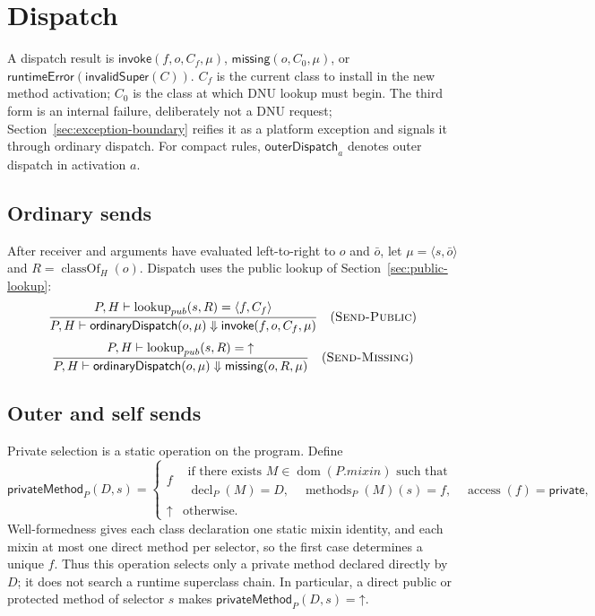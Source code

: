 \documentclass[11pt]{article}
\numberwithin{equation}{section}
\newcommand{\kw}[1]{\ensuremath{\mathsf{#1}}}
\newcommand{\undef}{\mathord{\uparrow}}
\newcommand{\Private}{\kw{private}}
\newcommand{\dom}{\mathop{\mathrm{dom}}}
\newcommand{\classof}{\mathop{\mathrm{classOf}}}
\newcommand{\decl}{\mathop{\mathrm{decl}}}
\newcommand{\access}{\mathop{\mathrm{access}}}
\newcommand{\methods}{\mathop{\mathrm{methods}}}
\newcommand{\lookup}{\mathop{\mathrm{lookup}}}
\newcommand{\rulelabel}[1]{\textsc{#1}}
\begin{document}
\section{Dispatch}

A dispatch result is $\kw{invoke}(f,o,C_f,\mu)$,
$\kw{missing}(o,C_0,\mu)$, or
$\kw{runtimeError}(\kw{invalidSuper}(C))$.  $C_f$ is the current class to
install in the new method activation; $C_0$ is the class at which DNU lookup
must begin.  The third form is an internal failure, deliberately not a DNU
request; Section~\ref{sec:exception-boundary} reifies it as a platform
exception and signals it through ordinary dispatch.
For compact rules, $\mathsf{outerDispatch}_a$ denotes outer dispatch in activation $a$.

\subsection{Ordinary sends}

After receiver and arguments have evaluated left-to-right to $o$ and $\bar o$,
let $\mu=\langle s,\bar o\rangle$ and $R=\classof_H(o)$.  Dispatch uses the
public lookup of Section~\ref{sec:public-lookup}:
\[
\dfrac{P,H\vdash\lookup_{pub}(s,R)=\langle f,C_f\rangle}
      {P,H\vdash\mathsf{ordinaryDispatch}(o,\mu)
       \Downarrow\kw{invoke}(f,o,C_f,\mu)}
\quad(\rulelabel{Send-Public})
\]
\[
\dfrac{P,H\vdash\lookup_{pub}(s,R)=\undef}
      {P,H\vdash\mathsf{ordinaryDispatch}(o,\mu)
       \Downarrow\kw{missing}(o,R,\mu)}
\quad(\rulelabel{Send-Missing})
\]

\subsection{Outer and self sends}
\label{sec:outer-self}

Private selection is a static operation on the program.  Define
\begin{equation}\label{eq:private-method}
 \mathsf{privateMethod}_P(D,s)=
 \begin{cases}
  f & \begin{array}{l}
        \text{if there exists }M\in\dom(P.\mathit{mixin})\text{ such that}\\[-1mm]
        \decl_P(M)=D,\quad \methods_P(M)(s)=f,\quad
        \access(f)=\Private,
      \end{array}\\[3mm]
  \undef & \text{otherwise.}
 \end{cases}
\end{equation}
Well-formedness gives each class declaration one static mixin identity, and
each mixin at most one direct method per selector, so the first case determines
a unique $f$.  Thus this operation selects only a private method declared
directly by $D$; it does not search a runtime superclass chain.  In particular,
a direct public or protected method of selector $s$ makes
$\mathsf{privateMethod}_P(D,s)=\undef$.
\end{document}
